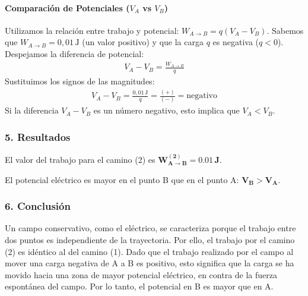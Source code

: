 \paragraph*{Comparación de Potenciales ($V_A$ vs $V_B$)}
Utilizamos la relación entre trabajo y potencial: $W_{A \to B} = q(V_A - V_B)$.
Sabemos que $W_{A \to B} = 0,01 \, \text{J}$ (un valor positivo) y que la carga $q$ es negativa ($q < 0$).
Despejamos la diferencia de potencial:
\begin{gather}
    V_A - V_B = \frac{W_{A \to B}}{q}
\end{gather}
Sustituimos los signos de las magnitudes:
\begin{gather}
    V_A - V_B = \frac{0,01 \, \text{J}}{q} = \frac{(+)}{(-)} = \text{negativo}
\end{gather}
Si la diferencia $V_A - V_B$ es un número negativo, esto implica que $V_A < V_B$.

\subsubsection*{5. Resultados}
\begin{cajaresultado}
El valor del trabajo para el camino (2) es $\boldsymbol{W_{A \to B}^{(2)} = 0.01 \, \textbf{J}}$.
\end{cajaresultado}

\medskip %

\begin{cajaresultado}
El potencial eléctrico es mayor en el punto B que en el punto A: $\boldsymbol{V_B > V_A}$.
\end{cajaresultado}

\subsubsection*{6. Conclusión}
\begin{cajaconclusion}
    Un campo conservativo, como el eléctrico, se caracteriza porque el trabajo entre dos puntos es independiente de la trayectoria. Por ello, el trabajo por el camino (2) es idéntico al del camino (1). Dado que el trabajo realizado por el campo al mover una carga negativa de A a B es positivo, esto significa que la carga se ha movido hacia una zona de mayor potencial eléctrico, en contra de la fuerza espontánea del campo. Por lo tanto, el potencial en B es mayor que en A.
\end{cajaconclusion}

\newpage
